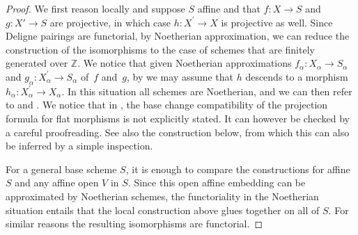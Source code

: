 \documentclass[JEP,XML,SOM,Unicode,published]{cedram}
\theoremstyle{plain}
\theoremstyle{definition}
\newcommand{\ZBbb}{\mathbb Z}
\begin{document}
\begin{proof}

We first reason locally and suppose $S$ affine and that $f \colon X \to S$ and $g \colon X' \to S$ are projective, in which case $h\colon X^{\prime}\to X$ is projective as well. Since Deligne pairings are functorial, by Noetherian approximation, we can reduce the construction of the isomorphisms to the case of schemes that are finitely generated over $\ZBbb$. We notice that given Noetherian approximations $f_{\alpha}\colon X_{\alpha}\to S_{\alpha}$ and $g_{\alpha}\colon X^{\prime}_{\alpha}\to S_{\alpha}$ of~$f$ and~$g$, by \cite[\href{https://stacks.math.columbia.edu/tag/01ZM}{01ZM}]{stacks-project} we may assume that $h$ descends to a morphism $h_{\alpha}\colon X^{\prime}_{\alpha}\to X_{\alpha}$. In this situation all schemes are Noetherian, and we can then refer to \cite[\textsection IV.2]{Elkikfib} and \cite[]{Munoz}. We notice that in \cite{Munoz}, the base change compatibility of the projection formula for flat morphisms is not explicitly stated. It can however be checked by a careful proofreading. See also the construction below, from which this can also be inferred by a simple inspection.

For a general base scheme $S$, it is enough to compare the constructions for affine~$S$ and any affine open $V$ in $S$. Since this open affine embedding can be approximated by Noetherian schemes, the functoriality in the Noetherian situation entails that the local construction above glues together on all of $S$. For similar reasons the resulting isomorphisms are functorial.


\end{proof}
\end{document}
